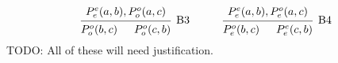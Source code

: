 \[
\begin{prooftree}[downwards]
  \Hypo{P^o_o(b,c)}
  \Hypo{P^o_o(c,b)}
  \Infer2[B3]{P^e_e(a,b), P^o_o(a,c)}
\end{prooftree}
\quad \quad \quad
\begin{prooftree}[downwards]
  \Hypo{P^o_e(b,c)}
  \Hypo{P^e_e(c,b)}
  \Infer2[B4]{P^e_e(a,b), P^o_e(a,c)}
\end{prooftree}
\]
TODO: All of these will need justification.
